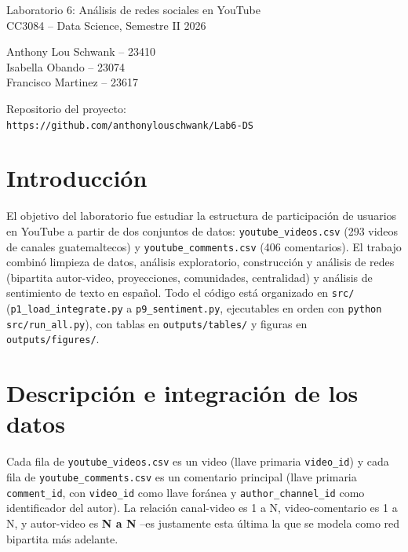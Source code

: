 \documentclass[11pt]{article}
\begin{document}
\begin{center}
{\LARGE Laboratorio 6: An\'alisis de redes sociales en YouTube}\\[4pt]
{\large CC3084 -- Data Science, Semestre II 2026}
\end{center}

\vspace{0.8cm}

\begin{center}
Anthony Lou Schwank -- 23410 \\
Isabella Obando -- 23074 \\
Francisco Martinez -- 23617
\end{center}

\vspace{0.5cm}

\begin{center}
Repositorio del proyecto:\\
\texttt{https://github.com/anthonylouschwank/Lab6-DS}
\end{center}

\vspace{0.5cm}

\section{Introducci\'on}

El objetivo del laboratorio fue estudiar la estructura de participaci\'on de
usuarios en YouTube a partir de dos conjuntos de datos: \texttt{youtube\_videos.csv}
(293 videos de canales guatemaltecos) y \texttt{youtube\_comments.csv} (406
comentarios). El trabajo combin\'o limpieza de datos, an\'alisis exploratorio,
construcci\'on y an\'alisis de redes (bipartita autor-video, proyecciones,
comunidades, centralidad) y an\'alisis de sentimiento de texto en espa\~nol. Todo el
c\'odigo est\'a organizado en \texttt{src/} (\texttt{p1\_load\_integrate.py} a
\texttt{p9\_sentiment.py}, ejecutables en orden con \texttt{python src/run\_all.py}),
con tablas en \texttt{outputs/tables/} y figuras en \texttt{outputs/figures/}.

\section{Descripci\'on e integraci\'on de los datos}

Cada fila de \texttt{youtube\_videos.csv} es un video (llave primaria
\texttt{video\_id}) y cada fila de \texttt{youtube\_comments.csv} es un comentario
principal (llave primaria \texttt{comment\_id}, con \texttt{video\_id} como llave
for\'anea y \texttt{author\_channel\_id} como identificador del autor). La relaci\'on
canal-video es 1 a N, video-comentario es 1 a N, y autor-video es \textbf{N a N}
--es justamente esta \'ultima la que se modela como red bipartita m\'as adelante.
\end{document}

